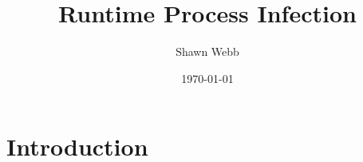 \documentclass[twocolumn]{article}
\begin{document}
\title{Runtime Process Infection}
\author{Shawn Webb}
\date{\today}
\maketitle

\begin{abstract}

\end{abstract}

\section{Introduction}

\end{document}
